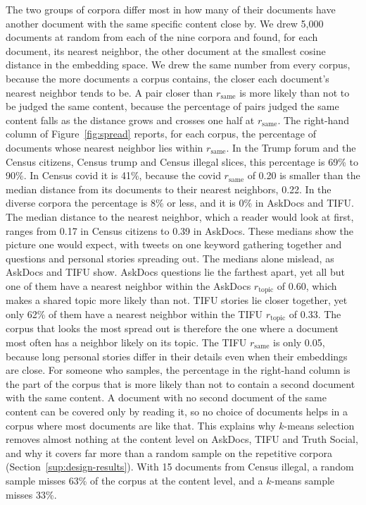 The two groups of corpora differ most in how many of their documents have another document with the same specific content close by. We drew 5{,}000 documents at random from each of the nine corpora and found, for each document, its nearest neighbor, the other document at the smallest cosine distance in the embedding space. We drew the same number from every corpus, because the more documents a corpus contains, the closer each document's nearest neighbor tends to be. A pair closer than $r_{\mathrm{same}}$ is more likely than not to be judged the same content, because the percentage of pairs judged the same content falls as the distance grows and crosses one half at $r_{\mathrm{same}}$. The right-hand column of Figure~\ref{fig:spread} reports, for each corpus, the percentage of documents whose nearest neighbor lies within $r_{\mathrm{same}}$. In the Trump forum and the Census citizens, Census trump and Census illegal slices, this percentage is 69\% to 90\%. In Census covid it is 41\%, because the covid $r_{\mathrm{same}}$ of 0.20 is smaller than the median distance from its documents to their nearest neighbors, 0.22. In the diverse corpora the percentage is 8\% or less, and it is 0\% in AskDocs and TIFU. The median distance to the nearest neighbor, which a reader would look at first, ranges from 0.17 in Census citizens to 0.39 in AskDocs. These medians show the picture one would expect, with tweets on one keyword gathering together and questions and personal stories spreading out. The medians alone mislead, as AskDocs and TIFU show. AskDocs questions lie the farthest apart, yet all but one of them have a nearest neighbor within the AskDocs $r_{\mathrm{topic}}$ of 0.60, which makes a shared topic more likely than not. TIFU stories lie closer together, yet only 62\% of them have a nearest neighbor within the TIFU $r_{\mathrm{topic}}$ of 0.33. The corpus that looks the most spread out is therefore the one where a document most often has a neighbor likely on its topic. The TIFU $r_{\mathrm{same}}$ is only 0.05, because long personal stories differ in their details even when their embeddings are close. For someone who samples, the percentage in the right-hand column is the part of the corpus that is more likely than not to contain a second document with the same content. A document with no second document of the same content can be covered only by reading it, so no choice of documents helps in a corpus where most documents are like that. This explains why $k$-means selection removes almost nothing at the content level on AskDocs, TIFU and Truth Social, and why it covers far more than a random sample on the repetitive corpora (Section~\ref{sup:design-results}). With 15 documents from Census illegal, a random sample misses 63\% of the corpus at the content level, and a $k$-means sample misses 33\%.

